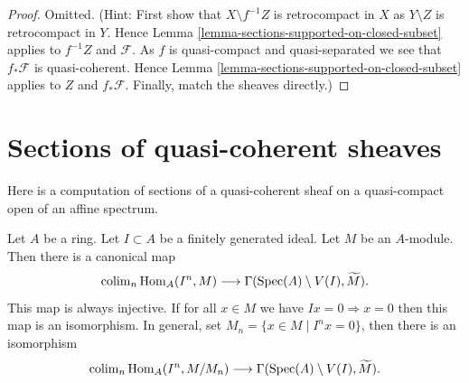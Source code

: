 \begin{proof}
Omitted. (Hint: First show that $X \setminus f^{-1}Z$ is retrocompact
in $X$ as $Y \setminus Z$ is retrocompact in $Y$. Hence
Lemma \ref{lemma-sections-supported-on-closed-subset}
applies to $f^{-1}Z$ and $\mathcal{F}$. As $f$ is quasi-compact and
quasi-separated we see that $f_*\mathcal{F}$ is quasi-coherent.
Hence Lemma \ref{lemma-sections-supported-on-closed-subset}
applies to $Z$ and $f_*\mathcal{F}$. Finally, match the sheaves
directly.)
\end{proof}








\section{Sections of quasi-coherent sheaves}
\label{section-sections-quasi-coherent}

\noindent
Here is a computation of sections of a quasi-coherent sheaf on a quasi-compact
open of an affine spectrum.

\begin{lemma}
\label{lemma-sections-over-quasi-compact-open-in-affine}
Let $A$ be a ring.
Let $I \subset A$ be a finitely generated ideal.
Let $M$ be an $A$-module.
Then there is a canonical map
$$
\mathop{\mathrm{colim}}\nolimits_n \mathop{\mathrm{Hom}}\nolimits_A(I^n, M)
\longrightarrow
\Gamma(\mathop{\mathrm{Spec}}(A) \setminus V(I), \widetilde{M}).
$$
This map is always injective.
If for all $x \in M$ we have $Ix = 0 \Rightarrow x = 0$
then this map is an isomorphism. In general, set
$M_n = \{x \in M \mid I^nx = 0\}$, then there is an
isomorphism
$$
\mathop{\mathrm{colim}}\nolimits_n \mathop{\mathrm{Hom}}\nolimits_A(I^n, M/M_n)
\longrightarrow
\Gamma(\mathop{\mathrm{Spec}}(A) \setminus V(I), \widetilde{M}).
$$
\end{lemma}

